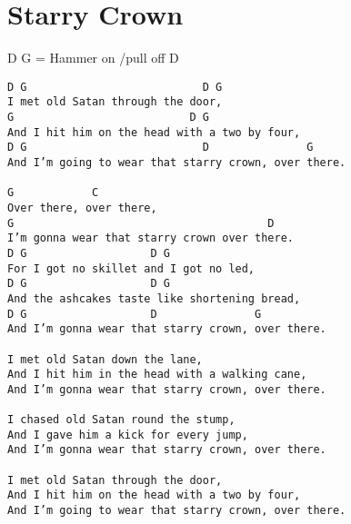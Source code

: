 \documentclass[leqno]{memoir}
\begin{document}
\chapter{Starry Crown}
D G = Hammer on /pull off D
\begin{verbatim}
D G                           D G
I met old Satan through the door,
G                           D G
And I hit him on the head with a two by four,
D G                           D               G
And I’m going to wear that starry crown, over there.

G            C
Over there, over there,
G                                       D
I’m gonna wear that starry crown over there.
D G                   D G
For I got no skillet and I got no led,
D G                   D G
And the ashcakes taste like shortening bread,
D G                   D               G
And I’m gonna wear that starry crown, over there.

I met old Satan down the lane,
And I hit him in the head with a walking cane,
And I’m gonna wear that starry crown, over there.

I chased old Satan round the stump,
And I gave him a kick for every jump,
And I’m gonna wear that starry crown, over there.

I met old Satan through the door,
And I hit him on the head with a two by four,
And I’m going to wear that starry crown, over there.


\end{verbatim}
\newpage
\end{document}
